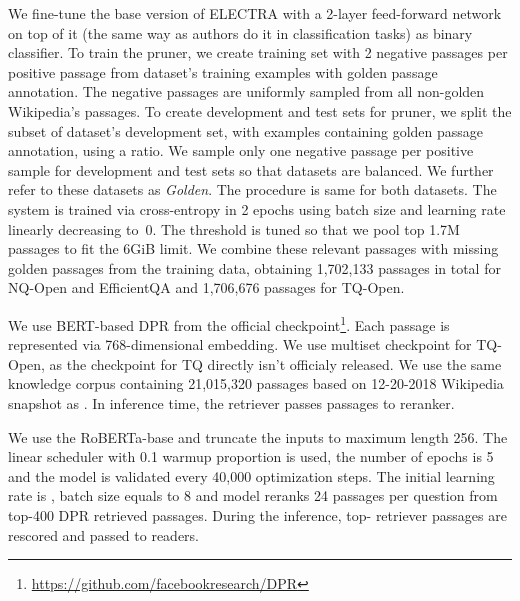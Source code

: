 \documentclass[11pt,a4paper]{article}
\begin{document}
\begin{description}[style=unboxed,leftmargin=0em,listparindent=\parindent]
\setlength\parskip{0em}

\item[Pruner and Pruning.]
 We fine-tune the base version of ELECTRA \cite{Clark2020ELECTRA:} with a 2-layer feed-forward network on top of it (the same way as authors do it in classification tasks) as binary classifier. 
To train the pruner, we create training set with 2 negative passages per positive passage from dataset's training examples with golden passage annotation.  The negative passages are uniformly sampled from all non-golden Wikipedia's passages.
To create development and test sets for pruner, we split the subset of dataset's development set, with examples containing golden passage annotation, using a  ratio. We sample only one negative passage per positive sample for development and test sets so that datasets are balanced. We further refer to these datasets as \emph{Golden}. The procedure is same for both datasets. The system is trained via cross-entropy in 2 epochs using batch size  and learning rate  linearly decreasing to~0.
The  threshold is tuned so that we pool top 1.7M passages to fit the 6GiB limit.
We combine these relevant passages with missing golden passages from the training data, obtaining 1,702,133 passages in total for NQ-Open and EfficientQA and 1,706,676 passages for TQ-Open.

\item[Retriever.]
We use BERT-based DPR from the official checkpoint\footnote{\url{https://github.com/facebookresearch/DPR}}. Each passage is represented via 768-dimensional embedding. We use multiset checkpoint for TQ-Open, as the checkpoint for TQ directly isn't officialy released.
We use the same knowledge corpus containing 21,015,320 passages based on 12-20-2018 Wikipedia snapshot as \citet{karpukhin2020dense}. In inference time, the retriever passes  passages  to reranker.

\item[Passage reranker.]
We use the RoBERTa-base \cite{liu2019roberta} and truncate the inputs to maximum length 256. The linear scheduler with 0.1 warmup proportion is used, the number of epochs is 5 and the model is validated every 40,000 optimization steps. 
The initial learning rate is , batch size equals to 8 and model reranks 24 passages per question from top-400 DPR retrieved passages.
During the inference, top- retriever passages are rescored and passed to readers.


\end{description}
\end{document}
